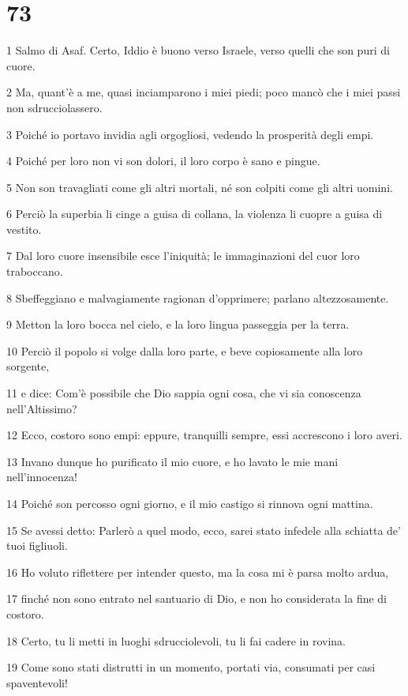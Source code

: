 \chapter{73}

\par 1 Salmo di Asaf. Certo, Iddio è buono verso Israele, verso quelli che son puri di cuore.
\par 2 Ma, quant'è a me, quasi inciamparono i miei piedi; poco mancò che i miei passi non sdrucciolassero.
\par 3 Poiché io portavo invidia agli orgogliosi, vedendo la prosperità degli empi.
\par 4 Poiché per loro non vi son dolori, il loro corpo è sano e pingue.
\par 5 Non son travagliati come gli altri mortali, né son colpiti come gli altri uomini.
\par 6 Perciò la superbia li cinge a guisa di collana, la violenza li cuopre a guisa di vestito.
\par 7 Dal loro cuore insensibile esce l'iniquità; le immaginazioni del cuor loro traboccano.
\par 8 Sbeffeggiano e malvagiamente ragionan d'opprimere; parlano altezzosamente.
\par 9 Metton la loro bocca nel cielo, e la loro lingua passeggia per la terra.
\par 10 Perciò il popolo si volge dalla loro parte, e beve copiosamente alla loro sorgente,
\par 11 e dice: Com'è possibile che Dio sappia ogni cosa, che vi sia conoscenza nell'Altissimo?
\par 12 Ecco, costoro sono empi: eppure, tranquilli sempre, essi accrescono i loro averi.
\par 13 Invano dunque ho purificato il mio cuore, e ho lavato le mie mani nell'innocenza!
\par 14 Poiché son percosso ogni giorno, e il mio castigo si rinnova ogni mattina.
\par 15 Se avessi detto: Parlerò a quel modo, ecco, sarei stato infedele alla schiatta de' tuoi figliuoli.
\par 16 Ho voluto riflettere per intender questo, ma la cosa mi è parsa molto ardua,
\par 17 finché non sono entrato nel santuario di Dio, e non ho considerata la fine di costoro.
\par 18 Certo, tu li metti in luoghi sdrucciolevoli, tu li fai cadere in rovina.
\par 19 Come sono stati distrutti in un momento, portati via, consumati per casi spaventevoli!
